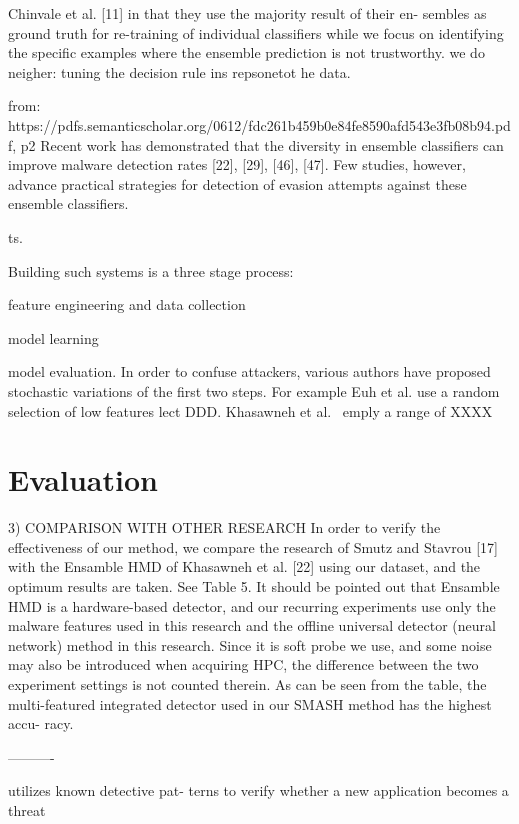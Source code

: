  Chinvale et al. [11]  in that they use the majority result of their en- sembles as ground truth for re-training of individual classifiers while we focus on identifying the specific examples where the ensemble prediction is not trustworthy. we do neigher: tuning the decision rule ins repsonetot he data.
 
from: https://pdfs.semanticscholar.org/0612/fdc261b459b0e84fe8590afd543e3fb08b94.pdf, p2
Recent work has demonstrated that the diversity in ensemble classifiers can improve malware detection rates [22], [29], [46], [47]. Few studies, however, advance practical strategies for detection of evasion attempts against these ensemble classifiers. 

 ts. 
  
  Building such systems is a three stage process:
  \bi
  \item
  feature engineering and data collection
  \item
  model learning
  \item
  model evaluation. 
  \ei
  In order to confuse attackers, various authors  have proposed stochastic variations of the first two steps.  For example Euh et al. 
  use  a random selection of low features lect DDD. 
  Khasawneh et al.~\cite{khasawneh2017rhmd} emply a range of XXXX
  
  
 


\section{Evaluation}
3) COMPARISON WITH OTHER RESEARCH
In order to verify the effectiveness of our method, we compare the research of Smutz and Stavrou [17] with the Ensamble HMD of Khasawneh et al. [22] using our dataset, and the optimum results are taken. See Table 5.
It should be pointed out that Ensamble HMD is a hardware-based detector, and our recurring experiments use
only the malware features used in this research and the offline universal detector (neural network) method in this research. Since it is soft probe we use, and some noise may also be introduced when acquiring HPC, the difference between the two experiment settings is not counted therein. As can be seen from the table, the multi-featured integrated detector used in our SMASH method has the highest accu- racy.

----------

  utilizes known detective pat- terns to verify whether a new application becomes a threat
   
